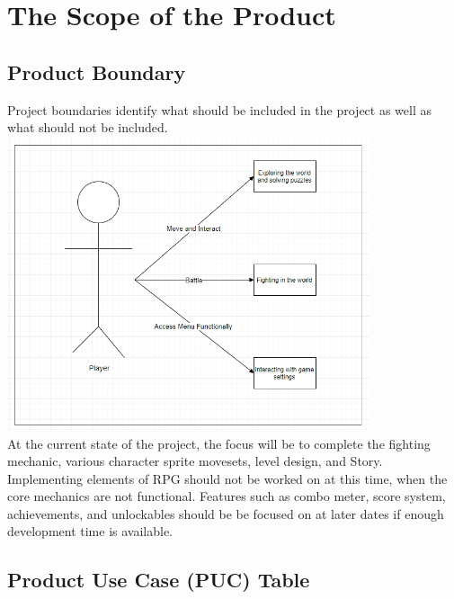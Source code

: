 \documentclass{article}
\begin{document}
\section{The Scope of the Product}
    \subsection{Product Boundary}
    Project boundaries identify what should be included in the project as well as what should not be included.\\
    
    \includegraphics[width=0.8\textwidth]{product-boundary.png} \\
    
    At the current state of the project, the focus will be to complete the fighting mechanic, various character sprite movesets, level design, and Story. Implementing elements of RPG should not be worked on at this time, when the core mechanics are not functional. Features such as combo meter, score system, achievements, and unlockables should be be focused on at later dates if enough development time is available.
    \subsection{Product Use Case (PUC) Table}
\end{document}
